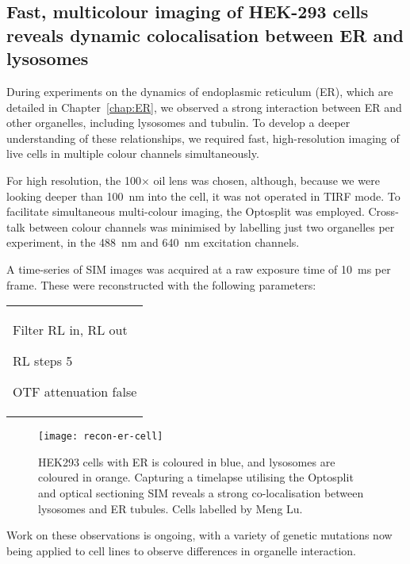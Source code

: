\subsection{Fast, multicolour imaging of HEK-293 cells reveals dynamic colocalisation between ER and lysosomes}
During experiments on the dynamics of endoplasmic reticulum (ER), which are detailed in Chapter~\ref{chap:ER}, we observed a strong interaction between ER and other organelles, including lysosomes and tubulin. 
To develop a deeper understanding of these relationships, we required fast, high-resolution imaging of live cells in multiple colour channels simultaneously. 

For high resolution, the 100$\times$ oil lens was chosen, although, because we were looking deeper than \SI{100}{\nano\metre} into the cell, it was not operated in TIRF mode. 
To facilitate simultaneous multi-colour imaging, the Optosplit was employed. 
Cross-talk between colour channels was minimised by labelling just two organelles per experiment, in the \SI{488}{\nano\metre} and \SI{640}{\nano\metre} excitation channels. 

A time-series of SIM images was acquired at a raw exposure time of \SI{10}{\milli\second} per frame. 
These were reconstructed with the following parameters: \newline
\begin{tabular}{p{}}
\begin{labelling}[margin=OTF attenuation]
	\item[Filter] RL in, RL out
	\item[RL steps] 5
	\item[OTF attenuation] false
\end{labelling}
\end{tabular}

\begin{figure}[tbp!]
\centering
\texttt{[image: recon-er-cell]}
\caption[LAG SIM: Fast, multi-colour imaging of ER in cells reveals co-localisation between lysosomes and ER tubules]{HEK293 cells with ER is coloured in blue, and lysosomes are coloured in orange. Capturing a timelapse utilising the Optosplit and optical sectioning SIM reveals a strong co-localisation between lysosomes and ER tubules. Cells labelled by Meng Lu. }
\label{fig:recon-er-cell}
\end{figure}

Work on these observations is ongoing, with a variety of genetic mutations now being applied to cell lines to observe differences in organelle interaction. 


